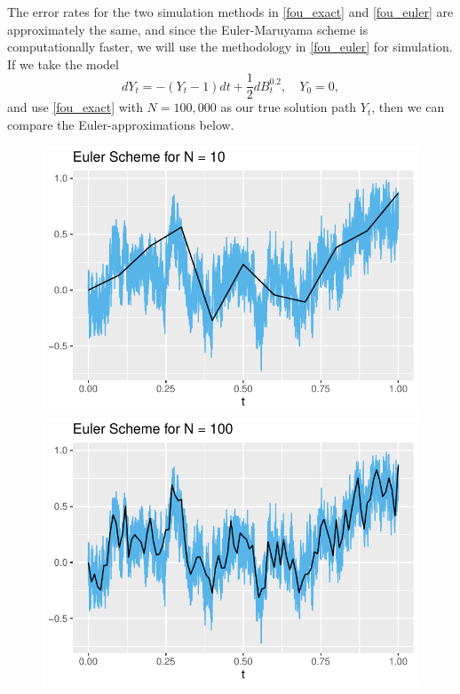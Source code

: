 The error rates for the two simulation methods in \eqref{fou_exact} and \eqref{fou_euler} are approximately the same, and since the Euler-Maruyama scheme is computationally faster, we will use the methodology in \eqref{fou_euler} for simulation. If we take the model 
\begin{equation}
    dY_{t}=-(Y_{t}-1)dt+\frac{1}{2}dB^{0.2}_{t},\quad Y_{0}=0,
\end{equation}
and use \eqref{fou_exact} with $N=100,000$ as our true solution path $Y_{t}$, then we can compare the Euler-approximations below.
\begin{figure}[H]
    \centering
    \includegraphics[scale=0.58]{fig/img/EulerScheme/EulerScheme10.pdf}\hfill
    \includegraphics[scale=0.58]{fig/img/EulerScheme/EulerScheme100.pdf}\hfill

\end{figure}
